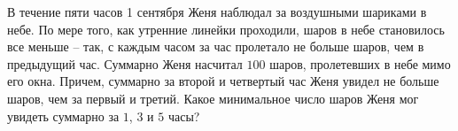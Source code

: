 
В течение пяти часов 1 сентября Женя наблюдал за воздушными шариками в небе. По мере того, как утренние линейки проходили, шаров в небе становилось все меньше -- так, с каждым часом за час пролетало не больше шаров, чем в предыдущий час. Суммарно Женя насчитал $100$ шаров, пролетевших в небе мимо его окна. Причем, суммарно за второй и четвертый час Женя увидел не больше шаров, чем за первый и третий. Какое минимальное число шаров Женя мог увидеть суммарно за $1$, $3$ и $5$ часы?

\solutionSection



